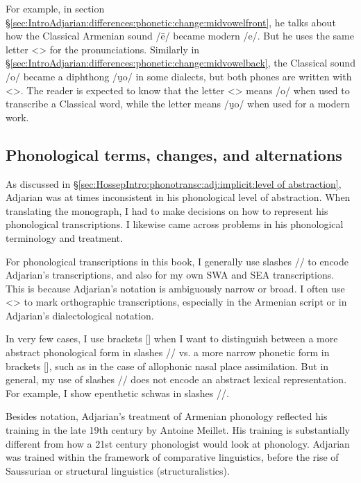 For example, in section \S\ref{sec:IntroAdjarian:differences:phonetic:change:midvowelfront}, he talks about how the Classical Armenian sound /ē/ became modern /e/. But he uses the same letter <> for the pronunciations. Similarly in \S\ref{sec:IntroAdjarian:differences:phonetic:change:midvowelback}, the Classical sound /o/ became a diphthong /u̯o/ in some dialects, but both phones are written with <>. The reader is expected to know that the letter <> means /o/ when used to transcribe a Classical word, while the letter means /u̯o/ when used for a modern work. 

 
\subsection{Phonological terms, changes, and  alternations}\label{sec:HossepIntro:translation:phono}
 

As discussed in \S\ref{sec:HossepIntro:phonotransc:adj:implicit:level of abstraction}, Adjarian was at times inconsistent in his phonological level of abstraction. When translating the monograph, I had to make decisions on how to represent his phonological transcriptions. I likewise came across problems in his phonological terminology and treatment.

For phonological transcriptions in this book, I generally use slashes // to encode Adjarian's transcriptions, and also for my own SWA and SEA transcriptions. This is because Adjarian's notation is ambiguously narrow or broad. I often use <> to mark orthographic transcriptions, especially in the Armenian script or in Adjarian's dialectological notation. 

In very few cases, I use brackets [] when I want to distinguish between a more abstract phonological form in slashes // vs. a more narrow phonetic form in brackets [], such as in the case of allophonic nasal place assimilation. But in general, my use of slashes // does not encode an abstract lexical representation. For example, I show epenthetic schwas in slashes //. 



Besides notation, Adjarian's treatment of Armenian phonology reflected his training in the late 19th century by Antoine Meillet. His training is substantially different from how a 21st century phonologist would look at phonology. Adjarian was trained within the framework of comparative linguistics, before the rise of Saussurian or structural linguistics (structuralistics). 


